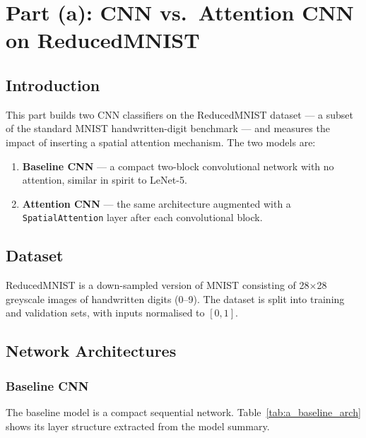 \documentclass[12pt,a4paper]{article}
\begin{document}
\section{Part (a): CNN vs.\ Attention CNN on ReducedMNIST}

\subsection{Introduction}

This part builds two CNN classifiers on the ReducedMNIST dataset — a subset of
the standard MNIST handwritten-digit benchmark — and measures the impact of
inserting a spatial attention mechanism. The two models are:

\begin{enumerate}[leftmargin=1.5em]
    \item \textbf{Baseline CNN} — a compact two-block convolutional network with no
          attention, similar in spirit to LeNet-5.
    \item \textbf{Attention CNN} — the same architecture augmented with a
          \texttt{SpatialAttention} layer after each convolutional block.
\end{enumerate}

\subsection{Dataset}

ReducedMNIST is a down-sampled version of MNIST consisting of 28$\times$28 greyscale
images of handwritten digits (0--9). The dataset is split into training and validation
sets, with inputs normalised to $[0,1]$.

\subsection{Network Architectures}

\subsubsection{Baseline CNN}

The baseline model is a compact sequential network. Table~\ref{tab:a_baseline_arch}
shows its layer structure extracted from the model summary.
\end{document}
